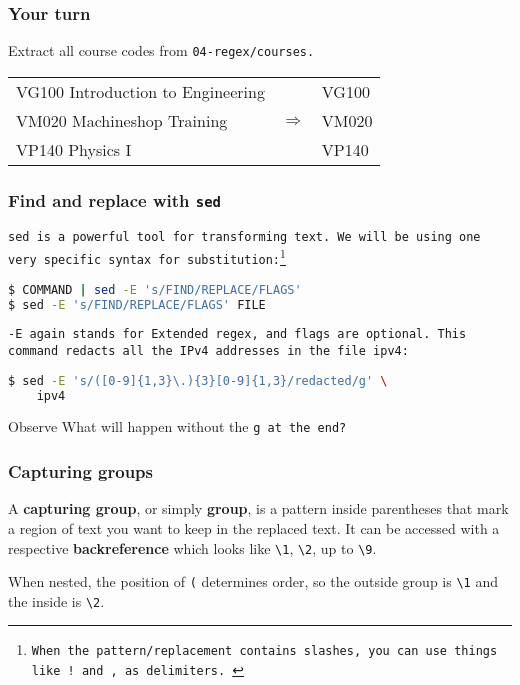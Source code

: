 \begin{frame}[fragile]
\frametitle{Your turn}
Extract all course codes from \tt{04-regex/courses}. \newline

\begin{example}
    \begin{tabular}{lcl}
        VG100 Introduction to Engineering & & VG100 \\
        VM020 Machineshop Training & $\Longrightarrow$ & VM020 \\
        VP140 Physics I & & VP140
    \end{tabular}
\end{example}
\end{frame}

\begin{frame}[fragile]
\frametitle{Find and replace with \tt{sed}}
\tt{sed} is a powerful tool for transforming text.
We will be using one very specific syntax for substitution:\footnote{
    When the pattern/replacement contains slashes, you can use things like
    \tt{!} and \tt{,} as delimiters.
}
\begin{lstlisting}[language=bash]
$ COMMAND | sed -E 's/FIND/REPLACE/FLAGS'
$ sed -E 's/FIND/REPLACE/FLAGS' FILE
\end{lstlisting}
\tt{-E} again stands for Extended regex, and flags are optional.
This command redacts all the IPv4 addresses in the file \tt{ipv4}:
\begin{lstlisting}[language=bash]
$ sed -E 's/([0-9]{1,3}\.){3}[0-9]{1,3}/redacted/g' \
    ipv4
\end{lstlisting}
\begin{block}{Observe}
    What will happen without the \tt{g} at the end?
\end{block}
\end{frame}

\begin{frame}[fragile]
\frametitle{Capturing groups}
A \textbf{capturing group}, or simply \textbf{group}, is a pattern inside
parentheses that mark a region of text you want to keep in the replaced text.
\newline \newline
It can be accessed with a respective \textbf{backreference} which looks like
\verb|\1|, \verb|\2|, up to \verb|\9|.

When nested, the position of \verb|(| determines order, so the outside group is
\verb|\1| and the inside is \verb|\2|.
\end{frame}

